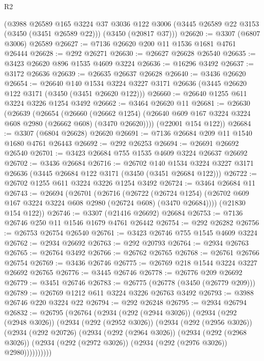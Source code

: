 \begin{lexlean}{R2}
\begin{coremodule}
    (@3988
      @26589
      @165
      @3224
      @37
      @3036
      @122
      @3006
      (@3445 @26589 @22 @3153 (@3450 (@3451 @26589 @22)))
      (@3450 (@20817 @37)))
@26620 := @3307 (@6807 @3006) @26589
@26627 := @7136 @26620 @200 @11 @1536 @1681 @4761 @26444
@26628 := @292 @26271
@26630 := @26627 @26628 @26540
@26635 := @3423 @26620 @896 @1535 @4609 @3224
@26636 := @16296 @3492
@26637 := @3172 @26636
@26639 := @26635 @26637 @26628
@26640 := @3436 @26620
@26654 := @26640
    @140
    @1534
    @3224
    @3227
    @3171
    @26636
    (@3445 @26620 @122 @3171 (@3450 (@3451 @26620 @122)))
@26660 := @26640 @1255 @611 @3224 @3226 @1254 @3492
@26662 := @3464 @26620 @11
@26681 := @26630
    (@26639
      (@26654
        (@26660
          (@26662 @1254)
          (@26640 @609 @167 @3224 @3224 @608 @2980 (@26662 @608) (@3470 @26620))))
      (@22001 @154 @122))
@26684 := @3307 (@6804 @26628) @26620
@26691 := @7136 @26684 @209 @11 @1540 @1680 @4761 @26443
@26692 := @292 @26253
@26694 := @26691 @26692 @26540
@26701 := @3423 @26684 @755 @1535 @4609 @3224 @26637 @26692
@26702 := @3436 @26684
@26716 := @26702
    @140
    @1534
    @3224
    @3227
    @3171
    @26636
    (@3445 @26684 @122 @3171 (@3450 (@3451 @26684 @122)))
@26722 := @26702 @1255 @611 @3224 @3226 @1254 @3492
@26724 := @3464 @26684 @11
@26743 := @26694
    (@26701
      (@26716
        (@26722
          (@26724 @1254)
          (@26702 @609 @167 @3224 @3224 @608 @2980 (@26724 @608) (@3470 @26684))))
      (@21830 @154 @122))
@26746 := @3307 (@21416 @26692) @26684
@26753 := @7136 @26746 @250 @11 @1546 @1679 @4761 @26442
@26754 := @292 @26282
@26756 := @26753 @26754 @26540
@26761 := @3423 @26746 @755 @1545 @4609 @3224
@26762 := @2934 @26692
@26763 := @292 @20793
@26764 := @2934 @26763
@26765 := @26764 @3492
@26766 := @26762 @26765
@26768 := @26761 @26766 @26754
@26769 := @3436 @26746
@26775 := @26769 @218 @1544 @3224 @3227 @26692 @26765
@26776 := @3445 @26746
@26778 := @26776 @209 @26692
@26779 := @3451 @26746
@26783 := @26775 (@26778 (@3450 (@26779 @209)))
@26789 := @26769 @1212 @611 @3224 @3226 @26763 @3492
@26793 := @3988 @26746 @220 @3224 @22
@26794 := @292 @26248
@26795 := @2934 @26794
@26832 := @26795
    (@26764
      (@2934
        (@292 (@2944 @3026))
        (@2934
          (@292 (@2948 @3026))
          (@2934
            (@292 (@2952 @3026))
            (@2934
              (@292 (@2956 @3026))
              (@2934
                (@292 @20726)
                (@2934
                  (@292 (@2964 @3026))
                  (@2934
                    (@292 (@2968 @3026))
                    (@2934 (@292 (@2972 @3026)) (@2934 (@292 (@2976 @3026)) @2980))))))))))

\end{coremodule}
\end{lexlean}
